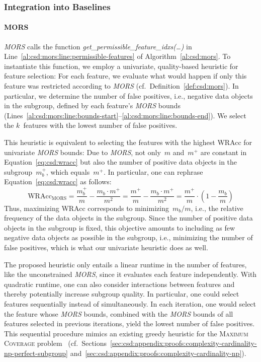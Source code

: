 \documentclass{article}
\theoremstyle{definition}
\begin{document}
\subsubsection{Integration into Baselines}
\label{sec:csd:approach:cardinality:baselines}

\paragraph{MORS}

\emph{MORS} calls the function \emph{get\_permissible\_feature\_idxs(\dots)} in Line~\ref{al:csd:mors:line:permissible-features} of Algorithm~\ref{al:csd:mors}.
To instantiate this function, we employ a univariate, quality-based heuristic for feature selection:
For each feature, we evaluate what would happen if only this feature was restricted according to \emph{MORS} (cf.~Definition~\ref{def:csd:mors}).
In particular, we determine the number of false positives, i.e., negative data objects in the subgroup, defined by each feature's \emph{MORS} bounds (Lines~\ref{al:csd:mors:line:bounds-start}--\ref{al:csd:mors:line:bounds-end}).
We select the $k$~features with the lowest number of false positives.

This heuristic is equivalent to selecting the features with the highest WRAcc for univariate \emph{MORS} bounds:
Due to \emph{MORS}, not only~$m$ and~$m^+$ are constant in Equation~\ref{eq:csd:wracc} but also the number of positive data objects in the subgroup~$m_b^+$, which equals~$m^+$.
In particular, one can rephrase Equation~\ref{eq:csd:wracc} as follows:
%
\begin{equation}
	\text{WRAcc}_{\text{MORS}} = \frac{m_b^+}{m} - \frac{m_b \cdot m^+}{m^2} = \frac{m^+}{m} - \frac{m_b \cdot m^+}{m^2} = \frac{m^+}{m} \cdot \left( 1 - \frac{m_b}{m} \right)
	\label{eq:csd:wracc-mors}
\end{equation}
%
Thus, maximizing WRAcc corresponds to minimizing~$m_b / m$, i.e., the relative frequency of the data objects in the subgroup.
Since the number of positive data objects in the subgroup is fixed, this objective amounts to including as few negative data objects as possible in the subgroup, i.e., minimizing the number of false positives, which is what our univariate heuristic does as well.

The proposed heuristic only entails a linear runtime in the number of features, like the unconstrained \emph{MORS}, since it evaluates each feature independently.
With quadratic runtime, one can also consider interactions between features and thereby potentially increase subgroup quality.
In particular, one could select features sequentially instead of simultaneously.
In each iteration, one would select the feature whose \emph{MORS} bounds, combined with the \emph{MORS} bounds of all features selected in previous iterations, yield the lowest number of false positives.
This sequential procedure mimics an existing greedy heuristic for the \textsc{Maximum Coverage} problem~\cite{chekuri2004maximum} (cf.~Sections~\ref{sec:csd:appendix:proofs:complexity-cardinality-np-perfect-subgroup} and~\ref{sec:csd:appendix:proofs:complexity-cardinality-np}).
\end{document}
